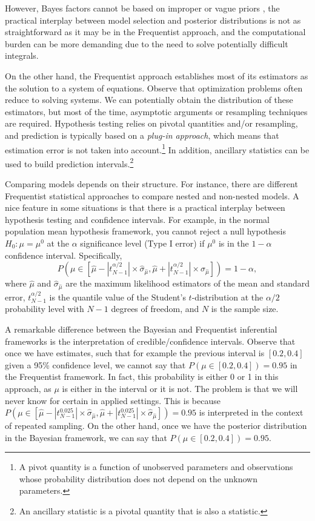However, Bayes factors cannot be based on improper or vague priors \cite{koop2003bayesian}, the practical interplay between model selection and posterior distributions is not as straightforward as it may be in the Frequentist approach, and the computational burden can be more demanding due to the need to solve potentially difficult integrals.

On the other hand, the Frequentist approach establishes most of its estimators as the solution to a system of equations. Observe that optimization problems often reduce to solving systems. We can potentially obtain the distribution of these estimators, but most of the time, asymptotic arguments or resampling techniques are required. Hypothesis testing relies on pivotal quantities and/or resampling, and prediction is typically based on a \textit{plug-in approach}, which means that estimation error is not taken into account.\footnote{A pivot quantity is a function of unobserved parameters and observations whose probability distribution does not depend on the unknown parameters.} In addition, ancillary statistics can be used to build prediction intervals.\footnote{An ancillary statistic is a pivotal quantity that is also a statistic.} 

Comparing models depends on their structure. For instance, there are different Frequentist statistical approaches to compare nested and non-nested models. A nice feature in some situations is that there is a practical interplay between hypothesis testing and confidence intervals. For example, in the normal population mean hypothesis framework, you cannot reject a null hypothesis $H_0: \mu = \mu^0$ at the $\alpha$ significance level (Type I error) if $\mu^0$ is in the $1-\alpha$ confidence interval. Specifically, 
\[
P\left( \mu \in \left[\hat{\mu} - |t_{N-1}^{\alpha/2}| \times \hat{\sigma}_{\hat{\mu}}, \hat{\mu} + |t_{N-1}^{\alpha/2}| \times \hat{\sigma}_{\hat{\mu}}\right] \right) = 1 - \alpha,
\]
where $\hat{\mu}$ and $\hat{\sigma}_{\hat{\mu}}$ are the maximum likelihood estimators of the mean and standard error, $t_{N-1}^{\alpha/2}$ is the quantile value of the Student's $t$-distribution at the $\alpha/2$ probability level with $N-1$ degrees of freedom, and $N$ is the sample size.

A remarkable difference between the Bayesian and Frequentist inferential frameworks is the interpretation of credible/confidence intervals. Observe that once we have estimates, such that for example the previous interval is $[0.2, 0.4]$ given a 95\% confidence level, we cannot say that $P(\mu \in [0.2, 0.4]) = 0.95$ in the Frequentist framework. In fact, this probability is either 0 or 1 in this approach, as $\mu$ is either in the interval or it is not. The problem is that we will never know for certain in applied settings. This is because $P(\mu \in [\hat{\mu} - |t_{N-1}^{0.025}| \times \hat{\sigma}_{\hat{\mu}}, \hat{\mu} + |t_{N-1}^{0.025}| \times \hat{\sigma}_{\hat{\mu}}]) = 0.95$ is interpreted in the context of repeated sampling. On the other hand, once we have the posterior distribution in the Bayesian framework, we can say that $P(\mu \in [0.2, 0.4]) = 0.95$.

